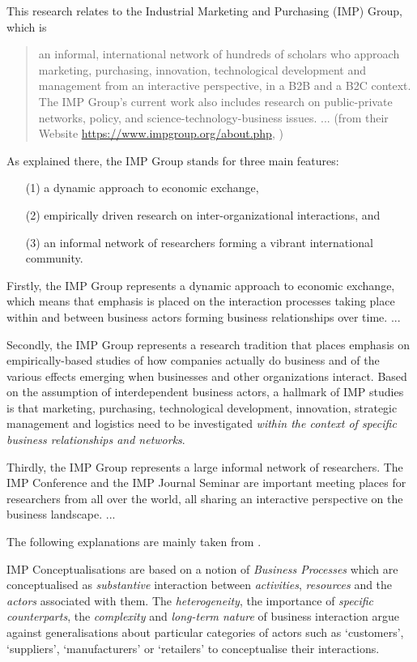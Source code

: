 \documentclass[11pt,a4paper]{article}
\begin{document}
This research relates to the Industrial Marketing and Purchasing (IMP) Group,
which is  
\begin{quote}
  an informal, international network of hundreds of scholars who approach
  marketing, purchasing, innovation, technological development and management
  from an interactive perspective, in a B2B and a B2C context. The IMP Group's
  current work also includes research on public-private networks, policy, and
  science-technology-business issues. ... (from their Website
  \url{https://www.impgroup.org/about.php}, )
\end{quote}
As explained there, the IMP Group stands for three main features: 
\begin{itemize}
\item[(1)] a dynamic approach to economic exchange,
\item[(2)] empirically driven research on inter-organizational interactions,
  and
\item[(3)] an informal network of researchers forming a vibrant international
  community.
\end{itemize}
Firstly, the IMP Group represents a dynamic approach to economic exchange,
which means that emphasis is placed on the interaction processes taking place
within and between business actors forming business relationships over time.
...

Secondly, the IMP Group represents a research tradition that places emphasis
on empirically-based studies of how companies actually do business and of the
various effects emerging when businesses and other organizations interact.
Based on the assumption of interdependent business actors, a hallmark of IMP
studies is that marketing, purchasing, technological development, innovation,
strategic management and logistics need to be investigated \emph{within the
  context of specific business relationships and networks}.

Thirdly, the IMP Group represents a large informal network of researchers. The
IMP Conference and the IMP Journal Seminar are important meeting places for
researchers from all over the world, all sharing an interactive perspective on
the business landscape. ...

The following explanations are mainly taken from \cite{FordMouzas2013}.

IMP Conceptualisations are based on a notion of \emph{Business Processes}
which are conceptualised as \emph{substantive} interaction between
\emph{activities}, \emph{resources} and the \emph{actors} associated with
them.  The \emph{heterogeneity}, the importance of \emph{speciﬁc
  counterparts}, the \emph{complexity} and \emph{long-term nature} of business
interaction argue against generalisations about particular categories of
actors such as ‘customers’, ‘suppliers’, ‘manufacturers’ or ‘retailers’ to
conceptualise their interactions.
\end{document}
